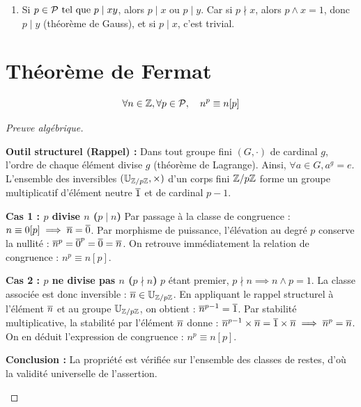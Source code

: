 \documentclass[12pt, a4paper]{report}
\begin{document}
\begin{application}
    \begin{enumerate}
        \item Si $p \in \mathcal{P} \text{ tel que } p \mid xy$, alors $p \mid x$ ou $p \mid y$. Car si $p \nmid x$, alors $p \wedge x = 1$, donc $p \mid y$ (théorème de Gauss), et si $p \mid x$, c'est trivial.
    \end{enumerate}
\end{application}

\section{Théorème de Fermat}

\begin{theorem}
    $$\forall n \in \mathbb{Z}, \forall p \in \mathcal{P}, \quad n^p \equiv n [p]$$
\end{theorem}

\begin{proof}[Preuve algébrique]
    \begin{outline}
        \1 \textbf{Outil structurel (Rappel) :} 
            \2 Dans tout groupe fini $(G, \cdot)$ de cardinal $g$, l'ordre de chaque élément divise $g$ (théorème de Lagrange). Ainsi, $\forall a \in G, a^g = e$.
            \2 L'ensemble des inversibles $(\mathbb{U}_{\mathbb{Z}/p\mathbb{Z}}, \times)$ d'un corps fini $\mathbb{Z}/p\mathbb{Z}$ forme un groupe multiplicatif d'élément neutre $\overline{1}$ et de cardinal $p-1$.
        
        \1 \textbf{Cas 1 : $p$ divise $n$ ($p \mid n$)}
            \2 Par passage à la classe de congruence : $n \equiv 0 [p] \implies \overline{n} = \overline{0}$.
            \2 Par morphisme de puissance, l'élévation au degré $p$ conserve la nullité : $\overline{n}^p = \overline{0}^p = \overline{0} = \overline{n}$. 
            \2 On retrouve immédiatement la relation de congruence : $n^p \equiv n [p]$.
        
        \1 \textbf{Cas 2 : $p$ ne divise pas $n$ ($p \nmid n$)}
            \2 $p$ étant premier, $p \nmid n \implies n \wedge p = 1$. La classe associée est donc inversible : $\overline{n} \in \mathbb{U}_{\mathbb{Z}/p\mathbb{Z}}$.
            \2 En appliquant le rappel structurel à l'élément $\overline{n}$ et au groupe $\mathbb{U}_{\mathbb{Z}/p\mathbb{Z}}$, on obtient : $\overline{n}^{p-1} = \overline{1}$.
            \2 Par stabilité multiplicative, la stabilité par l'élément $\overline{n}$ donne : $\overline{n}^{p-1} \times \overline{n} = \overline{1} \times \overline{n} \implies \overline{n}^p = \overline{n}$.
            \2 On en déduit l'expression de congruence : $n^p \equiv n [p]$.

        \1 \textbf{Conclusion :} La propriété est vérifiée sur l'ensemble des classes de restes, d'où la validité universelle de l'assertion.
    \end{outline}
\end{proof}
\end{document}
